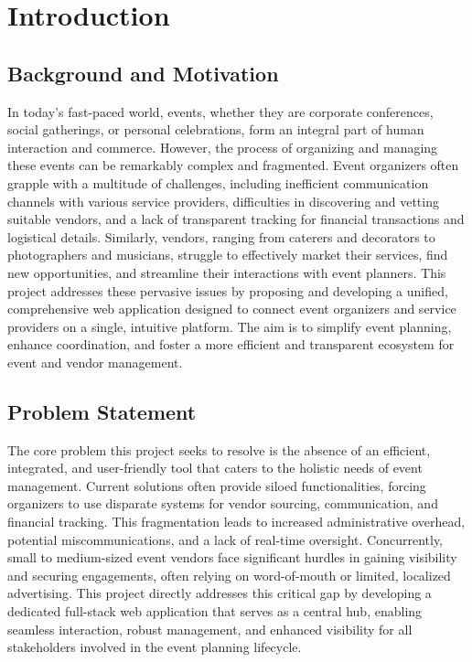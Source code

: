\documentclass{report}
\begin{document}
\chapter{Introduction}
\label{chap:introduction}

\section{Background and Motivation}
\label{sec:background_motivation}
In today's fast-paced world, events, whether they are corporate conferences, social gatherings, or personal celebrations, form an integral part of human interaction and commerce. However, the process of organizing and managing these events can be remarkably complex and fragmented. Event organizers often grapple with a multitude of challenges, including inefficient communication channels with various service providers, difficulties in discovering and vetting suitable vendors, and a lack of transparent tracking for financial transactions and logistical details. Similarly, vendors, ranging from caterers and decorators to photographers and musicians, struggle to effectively market their services, find new opportunities, and streamline their interactions with event planners. This project addresses these pervasive issues by proposing and developing a unified, comprehensive web application designed to connect event organizers and service providers on a single, intuitive platform. The aim is to simplify event planning, enhance coordination, and foster a more efficient and transparent ecosystem for event and vendor management.

\section{Problem Statement}
\label{sec:problem_statement}
The core problem this project seeks to resolve is the absence of an efficient, integrated, and user-friendly tool that caters to the holistic needs of event management. Current solutions often provide siloed functionalities, forcing organizers to use disparate systems for vendor sourcing, communication, and financial tracking. This fragmentation leads to increased administrative overhead, potential miscommunications, and a lack of real-time oversight. Concurrently, small to medium-sized event vendors face significant hurdles in gaining visibility and securing engagements, often relying on word-of-mouth or limited, localized advertising. This project directly addresses this critical gap by developing a dedicated full-stack web application that serves as a central hub, enabling seamless interaction, robust management, and enhanced visibility for all stakeholders involved in the event planning lifecycle.
\end{document}
